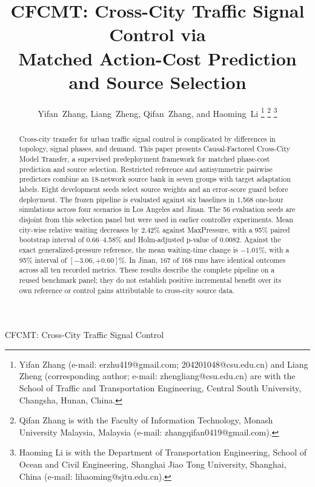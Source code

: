 \documentclass[letterpaper,journal]{IEEEtran}
\begin{document}
\title{CFCMT: Cross-City Traffic Signal Control via\\Matched Action-Cost Prediction and Source Selection}
\author{Yifan~Zhang, Liang~Zheng, Qifan~Zhang, and Haoming~Li%
\thanks{Yifan Zhang (e-mail: erzhu419@gmail.com; 204201048@csu.edu.cn) and Liang Zheng (corresponding author; e-mail: zhengliang@csu.edu.cn) are with the School of Traffic and Transportation Engineering, Central South University, Changsha, Hunan, China.}%
\thanks{Qifan Zhang is with the Faculty of Information Technology, Monash University Malaysia, Malaysia (e-mail: zhangqifan0419@gmail.com).}%
\thanks{Haoming Li is with the Department of Transportation Engineering, School of Ocean and Civil Engineering, Shanghai Jiao Tong University, Shanghai, China (e-mail: lihaoming@sjtu.edu.cn).}}
%
{CFCMT: Cross-City Traffic Signal Control}
\maketitle

\begin{abstract}
Cross-city transfer for urban traffic signal control is complicated by differences in topology, signal phases, and demand. This paper presents Causal-Factored Cross-City Model Transfer, a supervised predeployment framework for matched phase-cost prediction and source selection. Restricted reference and antisymmetric pairwise predictors combine an 18-network source bank in seven groups with target adaptation labels. Eight development seeds select source weights and an error-score guard before deployment. The frozen pipeline is evaluated against six baselines in 1,568 one-hour simulations across four scenarios in Los Angeles and Jinan. The 56 evaluation seeds are disjoint from this selection panel but were used in earlier controller experiments. Mean city-wise relative waiting decreases by 2.42\% against MaxPressure, with a 95\% paired bootstrap interval of 0.66--4.58\% and Holm-adjusted p-value of 0.0082. Against the exact generalized-pressure reference, the mean waiting-time change is $-1.01\%$, with a 95\% interval of $[-3.06,+0.60]\%$. In Jinan, 167 of 168 runs have identical outcomes across all ten recorded metrics. These results describe the complete pipeline on a reused benchmark panel; they do not establish positive incremental benefit over its own reference or control gains attributable to cross-city source data.
\end{abstract}
\end{document}
